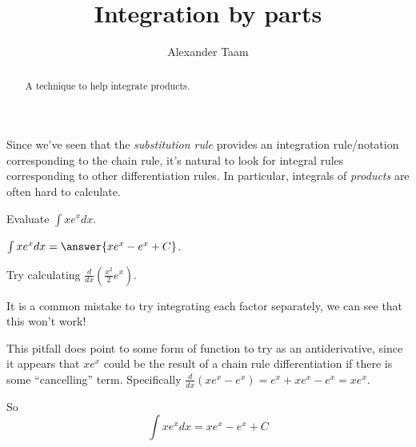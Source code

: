 \documentclass{ximera}
\title{Integration by parts}
\author{Alexander Taam}
\begin{document}
\begin{abstract}
  A technique to help integrate products.
\end{abstract}
\maketitle

Since we've seen that the \emph{substitution rule} provides an integration rule/notation corresponding to the chain rule, it's natural to look for integral rules corresponding to other differentiation rules. In particular, integrals of \emph{products} are often hard to calculate.

\begin{problem}
Evaluate $\int xe^xdx$.

$\int xe^xdx = \answer{xe^x-e^x+C}$.
\begin{hint}
Try calculating $\frac{d}{dx}(\frac{x^2}{2}e^x)$.

It is a common mistake to try integrating each factor separately, we can see that this won't work!
\end{hint}
\begin{explanation}
This pitfall does point to some form of function to try as an antiderivative, since it appears that $xe^x$ could be the result of a chain rule differentiation if there is some ``cancelling'' term. Specifically $\frac{d}{dx}(xe^x-e^x)=e^x+xe^x-e^x=xe^x$. 

So \[\int xe^xdx=xe^x-e^x+C\]
\end{explanation}

\end{problem}
\end{document}
